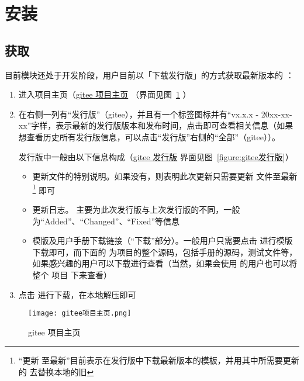 
\section{安装}

\subsection{获取 }

目前模块还处于开发阶段，用户目前以「下载发行版」的方式获取最新版本的 ：

\begin{enumerate}
  \item 进入项目主页（\href{https://gitee.com/zepinglee/exam-zh}{gitee 项目主页} （界面见图~\ref{figure:gitee项目主页} ）
  \item 在右侧一列有“发行版”（gitee），并且有一个标签图标并有“vx.x.x - 20xx-xx-xx”字样，表示最新的发行版版本和发布时间，点击即可查看相关信息（如果想查看历史所有发行版信息，可以点击“发行版”右侧的“全部”（gitee））。
  
    发行版中一般由以下信息构成（\href{https://gitee.com/zepinglee/exam-zh/releases}{gitee 发行版} 界面见图~\ref{figure:gitee发行版}）
      \begin{itemize}
        \item 更新文件的特别说明。如果没有，则表明此次更新只需要更新  文件至最新\footnote{“更新  至最新”目前表示在发行版中下载最新版本的模板，并用其中所需要更新的  去替换本地的旧 } 即可
        \item 更新日志。 主要为此次发行版与上次发行版的不同，一般为“Added”、“Changed”、“Fixed”等信息
        \item 模版及用户手册下载链接（“下载”部分）。一般用户只需要点击  进行模版下载即可，而下面的  为项目的整个源码，包括手册的源码，测试文件等，如果感兴趣的用户可以下载进行查看（当然，如果会使用  的用户也可以将整个  项目  下来查看）
      \end{itemize}
  \item 点击  进行下载，在本地解压即可
\end{enumerate}


\begin{figure}[htbp]
  \centering
  \texttt{[image: gitee项目主页.png]}
  \caption{gitee 项目主页}
  \label{figure:gitee项目主页}
\end{figure}


